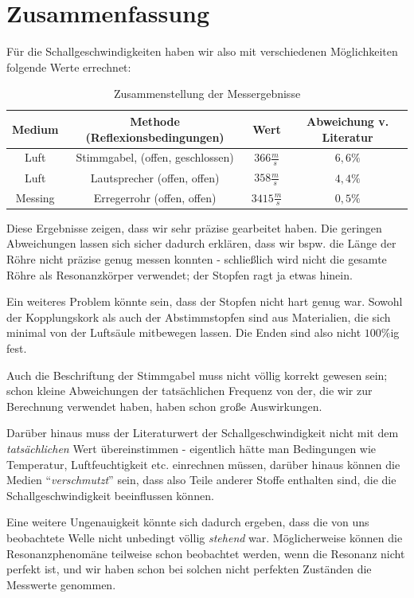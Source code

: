 


		\section{Zusammenfassung}

Für die Schallgeschwindigkeiten haben wir also mit verschiedenen Möglichkeiten folgende Werte errechnet:

\begin{table}[h]

\centering
 	\begin{tabular}{| c | c | c | c |}
\hline
Medium & Methode (Reflexionsbedingungen) & Wert & Abweichung v. Literatur \\
\hline
\hline

Luft & Stimmgabel, (offen, geschlossen) & \(366\frac{m}{s}\) & \(6,6\%\) \\

Luft & Lautsprecher (offen, offen) & \(358\frac{m}{s}\) & \(4,4\%\) \\

Messing & Erregerrohr (offen, offen) & \(3415\frac{m}{s}\) & \(0,5\%\) \\

\hline

\end{tabular}

\caption{Zusammenstellung der Messergebnisse}

\end{table}


Diese Ergebnisse zeigen, dass wir sehr präzise gearbeitet haben. Die geringen Abweichungen lassen sich sicher dadurch erklären, dass wir bspw. die Länge der Röhre nicht präzise genug messen konnten - schließlich wird nicht die gesamte Röhre als Resonanzkörper verwendet; der Stopfen ragt ja etwas hinein.

Ein weiteres Problem könnte sein, dass der Stopfen nicht hart genug war. Sowohl der Kopplungskork als auch der Abstimmstopfen sind aus Materialien, die sich minimal von der Luftsäule mitbewegen lassen. Die Enden sind also nicht \(100\%\)ig fest.

Auch die Beschriftung der Stimmgabel muss nicht völlig korrekt gewesen sein; schon kleine Abweichungen der tatsächlichen Frequenz von der, die wir zur Berechnung verwendet haben, haben schon große Auswirkungen.

Darüber hinaus muss der Literaturwert der Schallgeschwindigkeit nicht mit dem \emph{tatsächlichen} Wert überein\-stimmen - eigentlich hätte man Bedingungen wie Temperatur, Luftfeuchtigkeit etc. einrechnen müssen, darüber hinaus können die Medien ``\textit{verschmutzt}'' sein, dass also Teile anderer Stoffe enthalten sind, die die Schallgeschwindigkeit beeinflussen können.

Eine weitere Ungenauigkeit könnte sich dadurch ergeben, dass die von uns beobachtete Welle nicht unbedingt völlig \textit{stehend} war. Möglicherweise können die Resonanzphenomäne teilweise schon beobachtet werden, wenn die Resonanz nicht perfekt ist, und wir haben schon bei solchen nicht perfekten Zuständen die Messwerte genommen.



%
